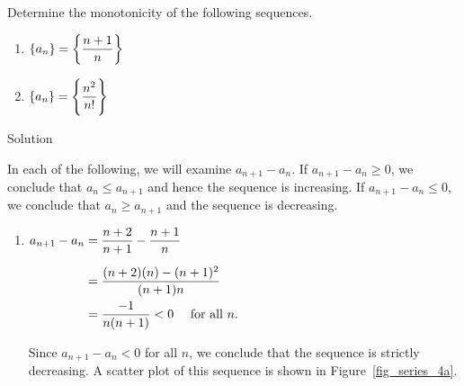 \begin{example}\label{ex_seq7}
Determine the monotonicity of the following sequences.
\begin{multicols}{2}
\begin{enumerate}
\item $\displaystyle \{a_n\} = \left\{\frac{n+1}n\right\}$
\item $\displaystyle \{a_n\} = \left\{\frac{n^2}{n!}\right\}$	
\end{enumerate}
\end{multicols}
Solution 

In each of the following, we will examine $a_{n+1}-a_n$. If $a_{n+1}-a_n \geq 0$, we conclude that $a_n\leq a_{n+1}$ and hence the sequence is increasing. If $a_{n+1}-a_n\leq 0$, we conclude that $a_n\geq a_{n+1}$ and the sequence is decreasing.

\begin{enumerate}
\item	\hfill	$\displaystyle\begin{aligned}[t] a_{n+1}-a_n &= \frac{n+2}{n+1} - \frac{n+1}{n} \\[0.2cm]		
					&= \frac{(n+2)(n)-(n+1)^2}{(n+1)n} \\
					&=	\frac{-1}{n(n+1)}  < 0 \quad\text{ for all $n$.}
				\end{aligned}$ \hfill\null
				
Since $a_{n+1}-a_n<0$ for all $n$, we conclude that the sequence is strictly  decreasing. A scatter plot of this sequence is shown in Figure~\ref{fig_series_4a}. 





\end{enumerate}
\end{example}
